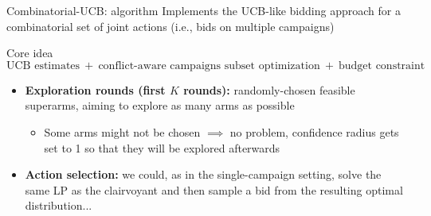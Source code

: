 \begin{frame}{Combinatorial-UCB: algorithm}
    Implements the UCB-like bidding approach for a combinatorial set of joint actions (i.e., bids on multiple campaigns)

    
    \begin{block}{Core idea}
        \vspace{-0.5cm}
        \[\boxed{\text{UCB estimates} \> + \> \text{conflict-aware campaigns subset optimization} \> + \> \text{budget constraint}}\]
    \end{block}

    \vspace{0.2cm}

    \begin{itemize}
        \item \textbf{Exploration rounds (first $K$ rounds):} randomly-chosen feasible superarms, aiming to explore as many arms as possible
        \begin{itemize}
            \item Some arms might not be chosen $\implies$ no problem, confidence radius gets set to 1 so that they will be explored afterwards
        \end{itemize}
        \item \textbf{Action selection:} we could, as in the single-campaign setting, solve the same LP as the clairvoyant and then sample a bid from the resulting optimal distribution...
    \end{itemize}
\end{frame}

